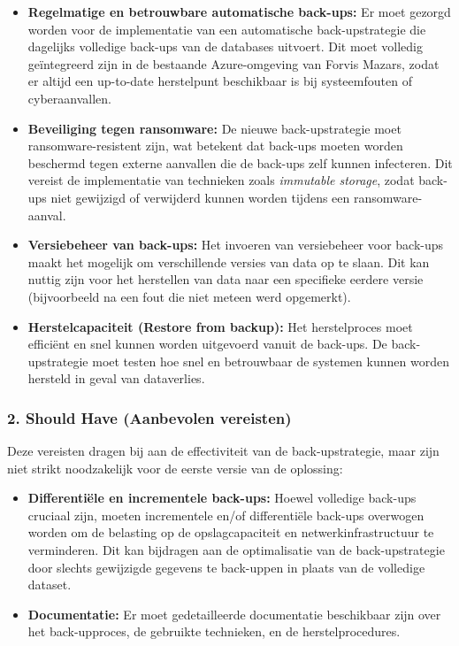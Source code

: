\begin{itemize}
    \item \textbf{Regelmatige en betrouwbare automatische back-ups:} Er moet gezorgd worden voor de implementatie van een automatische back-upstrategie die dagelijks volledige back-ups van de databases uitvoert. Dit moet volledig geïntegreerd zijn in de bestaande Azure-omgeving van Forvis Mazars, zodat er altijd een up-to-date herstelpunt beschikbaar is bij systeemfouten of cyberaanvallen.
    
    \item \textbf{Beveiliging tegen ransomware:} De nieuwe back-upstrategie moet ransomware-resistent zijn, wat betekent dat back-ups moeten worden beschermd tegen externe aanvallen die de back-ups zelf kunnen infecteren. Dit vereist de implementatie van technieken zoals \textit{immutable storage}, zodat back-ups niet gewijzigd of verwijderd kunnen worden tijdens een ransomware-aanval.
    
    \item \textbf{Versiebeheer van back-ups:} Het invoeren van versiebeheer voor back-ups maakt het mogelijk om verschillende versies van data op te slaan. Dit kan nuttig zijn voor het herstellen van data naar een specifieke eerdere versie (bijvoorbeeld na een fout die niet meteen werd opgemerkt).
    
    \item \textbf{Herstelcapaciteit (Restore from backup):} Het herstelproces moet efficiënt en snel kunnen worden uitgevoerd vanuit de back-ups. De back-upstrategie moet testen hoe snel en betrouwbaar de systemen kunnen worden hersteld in geval van dataverlies.
\end{itemize}

\subsubsection{2. Should Have (Aanbevolen vereisten)}
Deze vereisten dragen bij aan de effectiviteit van de back-upstrategie, maar zijn niet strikt noodzakelijk voor de eerste versie van de oplossing:

\begin{itemize}
    \item \textbf{Differentiële en incrementele back-ups:} Hoewel volledige back-ups cruciaal zijn, moeten incrementele en/of differentiële back-ups overwogen worden om de belasting op de opslagcapaciteit en netwerkinfrastructuur te verminderen. Dit kan bijdragen aan de optimalisatie van de back-upstrategie door slechts gewijzigde gegevens te back-uppen in plaats van de volledige dataset.
    
    \item \textbf{Documentatie:} Er moet gedetailleerde documentatie beschikbaar zijn over het back-upproces, de gebruikte technieken, en de herstelprocedures.
    
\end{itemize}

